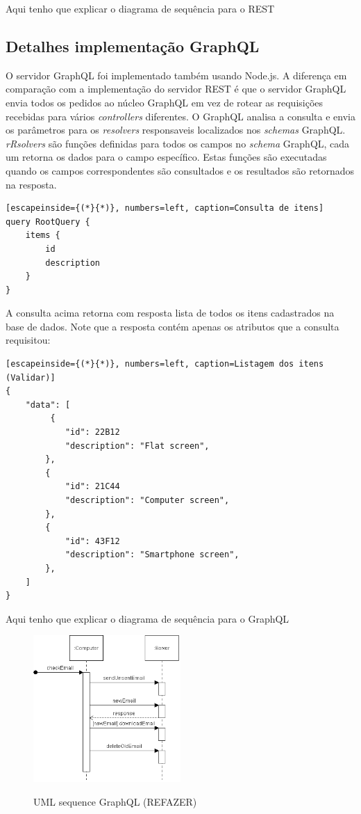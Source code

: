 Aqui tenho que explicar o diagrama de sequência para o REST

\subsection{Detalhes implementação GraphQL}

O servidor GraphQL foi implementado também usando Node.js. A diferença em comparação com a implementação do servidor REST é que o servidor GraphQL envia todos os pedidos ao núcleo GraphQL em vez de rotear as requisições recebidas para vários \textit{controllers} diferentes. O GraphQL analisa a consulta e envia os parâmetros para os \textit{resolvers} responsaveis localizados nos \textit{schemas} GraphQL. \textit{rRsolvers} são funções definidas para todos os campos no \textit{schema} GraphQL, cada um retorna os dados para o campo específico. Estas funções são executadas quando os campos correspondentes são consultados e os resultados são retornados na resposta.

\begin{lstlisting}[escapeinside={(*}{*)}, numbers=left, caption=Consulta de itens]
query RootQuery {
	items {
    	id
    	description
    }
}

\end{lstlisting}

A consulta acima retorna com resposta lista de todos os itens cadastrados na base de dados. Note que a resposta contém apenas os atributos que a consulta requisitou: 

\begin{lstlisting}[escapeinside={(*}{*)}, numbers=left, caption=Listagem dos itens (Validar)]
{
    "data": [
         {
        	"id": 22B12
            "description": "Flat screen",
        },
        {
        	"id": 21C44
            "description": "Computer screen",
        },
        {
        	"id": 43F12
            "description": "Smartphone screen",
        },
    ]
}

\end{lstlisting}

Aqui tenho que explicar o diagrama de sequência para o GraphQL

\begin{figure}[htbp]
\centering
\includegraphics[width=0.5\textwidth]{figuras/uml-sequence.png}
\label{fig:graph-uml}
\caption{UML sequence GraphQL (REFAZER)}
\author{fonte: Autor}
\end{figure}
\pagebreak


